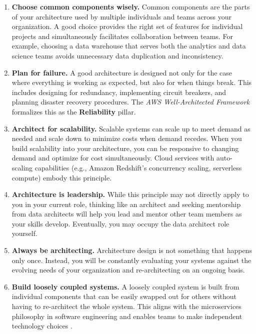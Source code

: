 \documentclass{article}
\begin{document}
\begin{enumerate}
    \item \textbf{Choose common components wisely.} Common components are the parts of your architecture used by multiple individuals and teams across your organization. A good choice provides the right set of features for individual projects and simultaneously facilitates collaboration between teams. For example, choosing a data warehouse that serves both the analytics and data science teams avoids unnecessary data duplication and inconsistency.

    \item \textbf{Plan for failure.} A good architecture is designed not only for the case where everything is working as expected, but also for when things break. This includes designing for redundancy, implementing circuit breakers, and planning disaster recovery procedures. The \textit{AWS Well-Architected Framework} \cite{aws2023waf} formalizes this as the \textbf{Reliability} pillar.

    \item \textbf{Architect for scalability.} Scalable systems can scale up to meet demand as needed and scale down to minimize costs when demand recedes. When you build scalability into your architecture, you can be responsive to changing demand and optimize for cost simultaneously. Cloud services with auto-scaling capabilities (e.g., Amazon Redshift's concurrency scaling, serverless compute) embody this principle.

    \item \textbf{Architecture is leadership.} While this principle may not directly apply to you in your current role, thinking like an architect and seeking mentorship from data architects will help you lead and mentor other team members as your skills develop. Eventually, you may occupy the data architect role yourself.

    \item \textbf{Always be architecting.} Architecture design is not something that happens only once. Instead, you will be constantly evaluating your systems against the evolving needs of your organization and re-architecting on an ongoing basis.

    \item \textbf{Build loosely coupled systems.} A loosely coupled system is built from individual components that can be easily swapped out for others without having to re-architect the whole system. This aligns with the microservices philosophy in software engineering and enables teams to make independent technology choices \cite{newman2015microservices}.


\end{enumerate}
\end{document}
